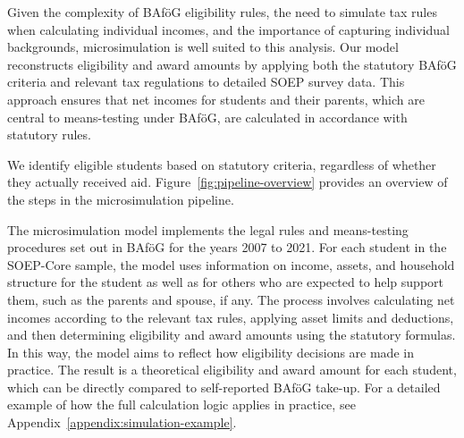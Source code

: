 Given the complexity of BAföG eligibility rules, the need to simulate tax rules when calculating individual incomes, and the importance of capturing individual backgrounds, microsimulation is well suited to this analysis. 
Our model reconstructs eligibility and award amounts by applying both the statutory BAföG criteria and relevant tax regulations to detailed SOEP survey data. 
This approach ensures that net incomes for students and their parents, which are central to means-testing under BAföG, are calculated in accordance with statutory rules.

We identify eligible students based on statutory criteria, regardless of whether they actually received aid. Figure~\ref{fig:pipeline-overview} provides an overview of the steps in the microsimulation pipeline.



The microsimulation model implements the legal rules and means-testing procedures set out in BAföG \citep{bafoeg_law} for the years 2007 to 2021. 
For each student in the SOEP-Core sample, the model uses information on income, assets, and household structure for the student as well as for others who are expected to help support them, such as the parents and spouse, if any. 
The process involves calculating net incomes according to the relevant tax rules, applying asset limits and deductions, and then determining eligibility and award amounts using the statutory formulas. 
In this way, the model aims to reflect how eligibility decisions are made in practice. The result is a theoretical eligibility and award amount for each student, which can be directly compared to self-reported BAföG take-up.
For a detailed example of how the full calculation logic applies in practice, see Appendix~\ref{appendix:simulation-example}.


